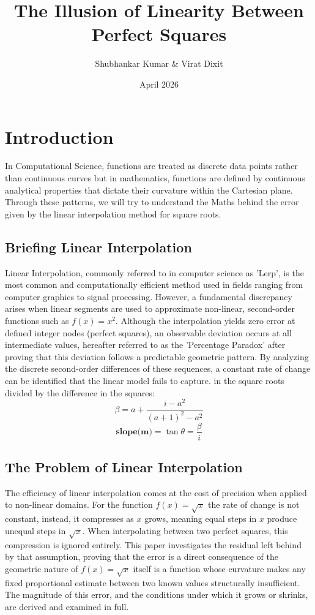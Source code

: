 \documentclass{article}
\title{The Illusion of Linearity Between Perfect Squares}
\author{Shubhankar Kumar \& Virat Dixit}
\date{April 2026}
\begin{document}
\maketitle
\section{Introduction}
In Computational Science, functions are treated as discrete data points rather than continuous curves but in mathematics, functions are defined by continuous analytical properties that dictate their curvature within the Cartesian plane. Through these patterns, we will try to understand the Maths behind the error given by the linear interpolation method for square roots.

\subsection{Briefing Linear Interpolation}
Linear Interpolation, commonly referred to in computer science as 'Lerp', is the most common and computationally efficient method used in fields ranging from computer graphics to signal processing. However, a fundamental discrepancy arises when linear segments are used to approximate non-linear, second-order functions such as $f(x) = x^2$. Although the interpolation yields zero error at defined integer nodes (perfect squares), an observable deviation occurs at all intermediate values, hereafter referred to as the 'Percentage Paradox' after proving that this deviation follows a predictable geometric pattern. By analyzing the discrete second-order differences of these sequences, a constant rate of change can be identified that the linear model fails to capture. 
in the square roots divided by the difference in the squares:
\begin{equation}
    \beta = a + \frac{i - a^2}{(a+1)^2 - a^2}
\end{equation}
\begin{equation}
    \textbf{slope(m)} = \tan\theta = \frac{\beta}{i}
\end{equation}

\subsection{The Problem of Linear Interpolation}
The efficiency of linear interpolation comes at the cost of precision when applied to non-linear domains. For the function $f(x)=\sqrt{x}$ the rate of change is not constant, instead, it compresses as $x$ grows, meaning equal steps in $x$ produce unequal steps in $\sqrt{x}$. When interpolating between two perfect squares, this compression is ignored entirely. This paper investigates the residual left behind by that assumption, proving that the error is a direct consequence of the geometric nature of $f(x)=\sqrt{x}$ itself is a function whose curvature makes any fixed proportional estimate between two known values structurally insufficient. The magnitude of this error, and the conditions under which it grows or shrinks, are derived and examined in full.
\end{document}
